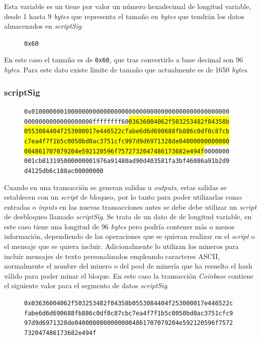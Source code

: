\documentclass{article}
\begin{document}
    Esta variable es un tiene por valor un número hexadecimal de longitud variable, desde 1 hasta 9 \textit{bytes} que representa el tamaño en \textit{bytes} que tendrán los datos almacenados en \textit{scriptSig}.
    \begin{figure}[H]
        \texttt{0x60}
    \end{figure}
    En este caso el tamaño es de \texttt{0x60}, que tras convertirlo a base decimal son 96 \textit{bytes}. Para este dato existe límite de tamaño que actualmente es de 1650 \textit{bytes}.
    
    \subsubsection{scriptSig}
    
    \begin{figure}[H]
        \texttt{0x0100000001000000000000000000000000000000000000000000000} \\
        \texttt{0000000000000000000ffffffff60\colorbox{Yellow}{03636004062f503253482f04358b}} \\
        \texttt{\colorbox{Yellow}{0553084404f253000017e446522cfabe6d6d690688fb886c0df0c87cb}} \\
        \texttt{\colorbox{Yellow}{c7ea4f7f1b5c0050bd0ac3751cfc997d9d6971328de04000000000000}} \\
        \texttt{\colorbox{Yellow}{004861707079204e592120596f7572732047486173682e494f}0000000} \\
        \texttt{001cb813195000000001976a91480ad90d403581fa3bf46086a91b2d9} \\
        \texttt{d4125db6c188ac00000000}
    \end{figure}
    
    Cuando en una transacción se generan salidas u \textit{outputs}, estas salidas se establecen con un \textit{script} de bloqueo, por lo tanto para poder utilizarlas como entradas o \textit{inputs} en las nuevas transacciones antes se debe debe utilizar un \textit{script} de desbloqueo llamado \textit{scriptSig}. Se trata de un dato de de longitud variable, en este caso tiene una longitud de 96 \textit{bytes} pero podría contener más o menos información, dependiendo de las operaciones que se quieran realizar en el \textit{script} o el mensaje que se quiera incluir. Adicionalmente lo utilizan los mineros para incluir mensajes de texto personalizados empleando caracteres ASCII, normalmente el nombre del minero o del pool de minería que ha resuelto el hash válido para poder minar el bloque. En este caso la transacción \textit{Coinbase} contiene el siguiente valor para el segmento de datos \textit{scriptSig}.
    \begin{figure}[H]
        \texttt{0x03636004062f503253482f04358b0553084404f253000017e446522c} \\
        \texttt{fabe6d6d690688fb886c0df0c87cbc7ea4f7f1b5c0050bd0ac3751cfc9}
        \texttt{97d9d6971328de04000000000000004861707079204e592120596f7572}
        \texttt{732047486173682e494f}
    \end{figure}
    
\end{document}
